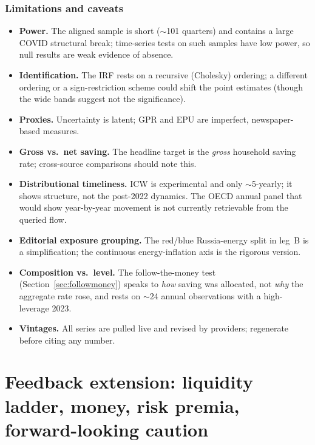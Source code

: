 \documentclass[11pt,a4paper]{article}
\begin{document}
\section{Limitations and caveats}\label{sec:limits}
\begin{itemize}
  \item \textbf{Power.} The aligned sample is short ($\sim$101 quarters) and
  contains a large COVID structural break; time-series tests on such samples have
  low power, so null results are weak evidence of absence.
  \item \textbf{Identification.} The IRF rests on a recursive (Cholesky)
  ordering; a different ordering or a sign-restriction scheme could shift the
  point estimates (though the wide bands suggest not the significance).
  \item \textbf{Proxies.} Uncertainty is latent; GPR and EPU are imperfect,
  newspaper-based measures.
  \item \textbf{Gross vs.\ net saving.} The headline target is the \emph{gross}
  household saving rate; cross-source comparisons should note this.
  \item \textbf{Distributional timeliness.} ICW is experimental and only
  $\sim$5-yearly; it shows structure, not the post-2022 dynamics. The OECD annual
  panel that would show year-by-year movement is not currently retrievable from
  the queried flow.
  \item \textbf{Editorial exposure grouping.} The red/blue Russia-energy split in
  leg~B is a simplification; the continuous energy-inflation axis is the rigorous
  version.
  \item \textbf{Composition vs.\ level.} The follow-the-money test
  (Section~\ref{sec:followmoney}) speaks to \emph{how} saving was allocated, not
  \emph{why} the aggregate rate rose, and rests on $\sim$24 annual observations
  with a high-leverage 2023.
  \item \textbf{Vintages.} All series are pulled live and revised by providers;
  regenerate before citing any number.
\end{itemize}


\clearpage
\part{Feedback extension: liquidity ladder, money, risk premia, forward-looking caution}
\end{document}
